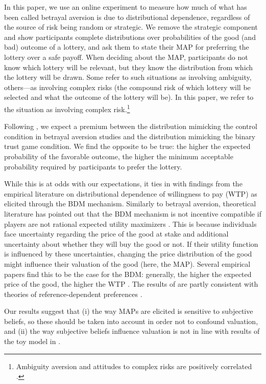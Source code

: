 In this paper, we use an online experiment to measure how much of what has been called betrayal aversion is due to distributional dependence, regardless of the source of risk being random or strategic.
We remove the strategic component and show participants complete distributions over probabilities of the good (and bad) outcome of a lottery, and ask them to state their MAP for preferring the lottery over a safe payoff.
When deciding about the MAP, participants do not know which lottery will be relevant, but they know the distribution from which the lottery will be drawn.
Some refer to such situations as involving ambiguity, others---as involving complex risks (the compound risk of which lottery will be selected and what the outcome of the lottery will be).
In this paper, we refer to the situation as involving complex risk.\footnote{
Ambiguity aversion and attitudes to complex risks are positively correlated \citep{Armantier2016}.
}

Following \cite{Li2020a}, we expect a premium between the distribution mimicking the control condition in betrayal aversion studies and the distribution mimicking the binary trust game condition.
We find the opposite to be true: the higher the expected probability of the favorable outcome, the higher the minimum acceptable probability required by participants to prefer the lottery.

While this is at odds with our expectations, it ties in with findings from the empirical literature on distributional dependence of willingness to pay (WTP) as elicited through the BDM mechanism.
Similarly to betrayal aversion, theoretical literature has pointed out that the BDM mechanism is not incentive compatible if players are not rational expected utility maximizers \citep{Karni1987,Horowitz2006}.
This is because individuals face uncertainty regarding the price of the good at stake and additional uncertainty about whether they will buy the good or not.
If their utility function is influenced by these uncertainties, changing the price distribution of the good might influence their valuation of the good (here, the MAP).
Several empirical papers find this to be the case for the BDM: generally, the higher the expected price of the good, the higher the WTP \citep[for a short review of this literature, see][]{Tymula2016}.
The results of \cite{Tymula2016} are partly consistent with theories of reference-dependent preferences \citep{Koszegi2006, Koszegi2007, Wenner2015}.

Our results suggest that (i) the way MAPs are elicited is sensitive to subjective beliefs, so these should be taken into account in order not to confound valuation, and (ii) the way subjective beliefs influence valuation is not in line with results of the toy model in \cite{Li2020a}.

